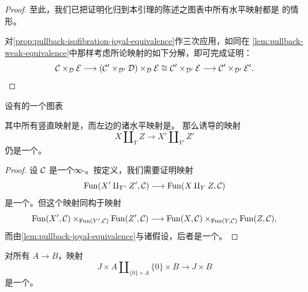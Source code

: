 \begin{proof}
至此，我们已把证明化归到本引理的陈述之图表中所有水平映射都是\trIsofibration{}%
的情形。

对\cref{prop:pullback-isofibration-joyal-equivalence}作三次应用，如同在%
\cref{lem:pullback-weak-equivalence}中那样考虑所论映射的如下分解，即可完成证明：
\[
\mathcal{C} \times_{\mathcal{D}} \mathcal{E} \longrightarrow (\mathcal{C}' \times_{\mathcal{D}'} \mathcal{D}) \times_{\mathcal{D}} \mathcal{E}
\cong \mathcal{C}' \times_{\mathcal{D}'} \mathcal{E} \longrightarrow \mathcal{C}' \times_{\mathcal{D}'} \mathcal{E}'.
\]
\end{proof}

\begin{corollary}\label{cor:pushout-joyal-equivalence}
设有\trSimplicialSets{}的一个图表
\begin{center}
\end{center}
其中所有竖直映射是\trJoyalEquivalence{}，而左边的诸水平映射是\trMonomorphism{}。
那么诱导的映射
\[
X \amalg_{Y} Z \longrightarrow X' \amalg_{Y'} Z'
\]
仍是一个\trJoyalEquivalence{}。
\end{corollary}

\begin{proof}
设 $\mathcal{C}$ 是一个∞-\trCategory{}。按定义，我们需要证明映射
\[
\mathrm{Fun}(X' \amalg_{Y'} Z', \mathcal{C}) \longrightarrow \mathrm{Fun}(X \amalg_{Y} Z, \mathcal{C})
\]
是一个\trJoyalEquivalence{}。但这个映射同构于映射
\[
\mathrm{Fun}(X', \mathcal{C}) \times_{\mathrm{Fun}(Y', \mathcal{C})} \mathrm{Fun}(Z', \mathcal{C})
\longrightarrow
\mathrm{Fun}(X, \mathcal{C}) \times_{\mathrm{Fun}(Y, \mathcal{C})} \mathrm{Fun}(Z, \mathcal{C}),
\]
而由\cref{lem:pullback-joyal-equivalence}与诸假设，后者是一个\trJoyalEquivalence{}。
\end{proof}

\begin{corollary}\label{cor:pushout-product-j}
对所有\trMonomorphism{} $A \to B$，\trPushoutProduct{}映射
\[
J \times A \amalg_{\{0\} \times A} \{0\} \times B \longrightarrow J \times B
\]
是一个\trJoyalEquivalence{}。
\end{corollary}


